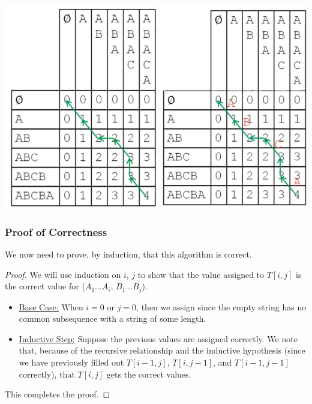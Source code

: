 \documentclass[letterpaper]{article}
\begin{document}
\begin{center}
    \includegraphics[scale=0.4]{../assets/lcss_2.png}
\end{center}


\subsubsection{Proof of Correctness}
We now need to prove, by induction, that this algorithm is correct. 

\begin{mdframed}[]
    \begin{proof}
        We will use induction on $i$, $j$ to show that the value assigned to $T[i, j]$ is the correct value for ($A_1 \dots A_i$, $B_1 \dots B_j$).
        \begin{itemize}
            \item \underline{Base Case:} When $i = 0 $ or $j = 0$, then we assign  since the empty string has no common subsequence with a string of some length. 
            \item \underline{Inductive Step:} Suppose the previous values are assigned correctly. We note that, because of the recursive relationship and the inductive hypothesis (since we have previously filled out $T[i - 1, j]$, $T[i, j - 1]$, and $T[i - 1, j - 1]$ correctly), that $T[i, j]$ gets the correct values. 
        \end{itemize}
        This completes the proof. 
    \end{proof}
\end{mdframed}
\end{document}
